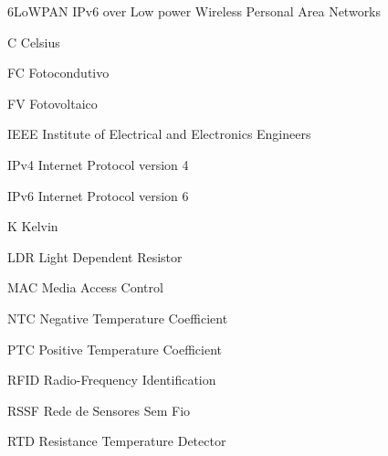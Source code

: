 \begin{siglas}
\item [6LoWPAN] IPv6 over Low power Wireless Personal Area Networks
\item [C]	Celsius
\item [FC]	Fotocondutivo
\item [FV]	Fotovoltaico
\item [IEEE]	Institute of Electrical and Electronics Engineers
\item [IPv4]	Internet Protocol version 4
\item [IPv6]	Internet Protocol version 6
\item [K]	Kelvin
\item [LDR]	Light Dependent Resistor
\item [MAC]	Media Access Control
\item [NTC]	Negative Temperature Coefficient
\item [PTC]	Positive Temperature Coefficient
\item [RFID]	Radio-Frequency Identification
\item [RSSF]	Rede de Sensores Sem Fio
\item [RTD]	Resistance Temperature Detector
\end{siglas}
